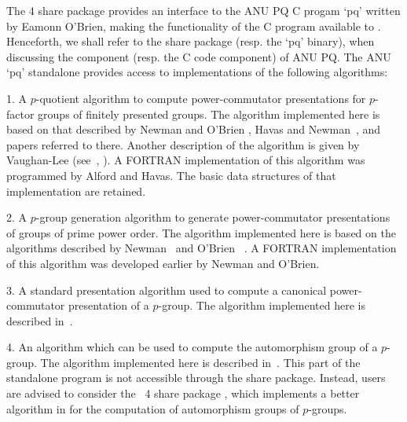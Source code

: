 

The {\GAP} 4 share package {\ANUPQ} provides an interface to the ANU PQ C
progam `pq' written by Eamonn O'Brien, making the functionality of the  C
program available to {\GAP}. Henceforth, we shall refer to  the  {\ANUPQ}
share package  (resp.  the  `pq'  binary),  when  discussing  the  {\GAP}
component (resp. the C code component) of ANU PQ. The ANU `pq' standalone
provides access to implementations of the following algorithms:

\beginlist

\item{1.}
A $p$-quotient algorithm to compute  power-commutator  presentations  for
$p$-factor groups of finitely presented groups. The algorithm implemented
here is based on that described by Newman and O'Brien \cite{NO96},  Havas
and Newman~\cite{HN80}, and papers referred to there. Another description
of  the   algorithm   is   given   by   Vaughan-Lee   (see~\cite{Vau90a},
\cite{Vau90b}). A FORTRAN implementation of this algorithm was programmed
by Alford and Havas. The basic data structures of that implementation are
retained.

\item{2.} 
A   $p$-group   generation   algorithm   to   generate   power-commutator
presentations of groups of prime power order. The  algorithm  implemented
here is based on the  algorithms  described  by  Newman~\cite{New77}  and
O'Brien ~\cite{OBr90}. A FORTRAN implementation  of  this  algorithm  was
developed earlier by Newman and O'Brien.

\item{3.}
A  standard  presentation  algorithm  used   to   compute   a   canonical
power-commutator presentation of a $p$-group. The  algorithm  implemented
here is described in~\cite{OBr94}.

\item{4.} 
An algorithm which can be used to compute the  automorphism  group  of  a
$p$-group. The algorithm implemented here is  described  in~\cite{OBr94}.
This part of  the  standalone  program  is  not  accessible  through  the
{\ANUPQ} share package.  Instead,  users  are  advised  to  consider  the
{\GAP}~4 share package {\AutPGrp}, which implements a better algorithm in
{\GAP} for the computation of automorphism groups of $p$-groups.

